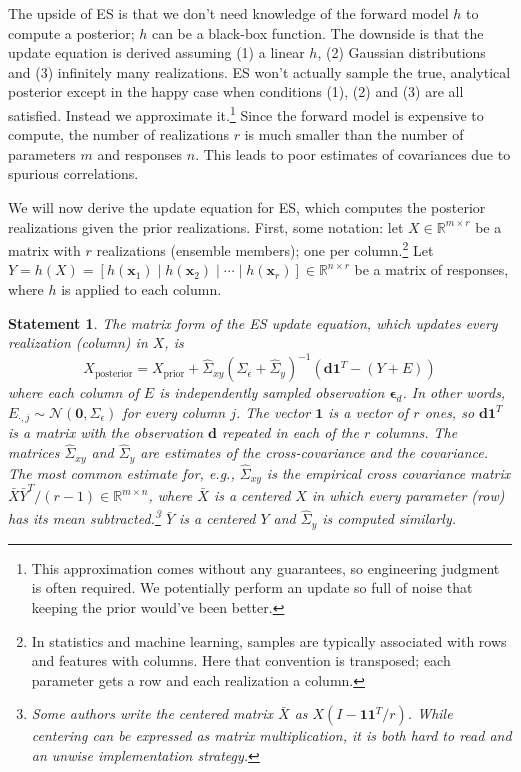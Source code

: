 \documentclass[12pt, a4paper]{article}
\theoremstyle{spaced}
\theoremstyle{spaceddef}
\numberwithin{equation}{section}
\newtheorem{statementinner}[theorem]{Statement}
\newenvironment{statement}
{\savenotes
    \begin{tcolorbox}[colback=white, colframe=black!80, arc=4pt, boxrule=0.5pt]%
        \begin{statementinner}}
        {\end{statementinner}\end{tcolorbox}\spewnotes}
\newcommand{\R}{\mathbb{R}}
\begin{document}
The upside of ES is that we don't need knowledge of the forward model $h$ to compute a posterior; $h$ can be a black-box function.
The downside is that the update equation is derived assuming (1) a linear $h$, (2) Gaussian distributions and (3) infinitely many realizations.
ES won't actually sample the true, analytical posterior except in the happy case when conditions (1), (2) and (3) are all satisfied.
Instead we approximate it.\footnote{This approximation comes without any guarantees, so engineering judgment is often required. We potentially perform an update so full of noise that keeping the prior would've been better.}
Since the forward model is expensive to compute, the number of realizations $r$ is much smaller than the number of parameters $m$ and responses $n$.
This leads to poor estimates of covariances due to spurious correlations.

We will now derive the update equation for ES, which computes the posterior realizations given the prior realizations.
First, some notation: let $X \in \R^{m \times r}$ be a matrix with $r$ realizations (ensemble members); one per column.\footnote{In statistics and machine learning, samples are typically associated with rows and features with columns. Here that convention is transposed; each parameter gets a row and each realization a column.}
Let $Y = h(X) = [ h(\bm{x}_1) \mid h(\bm{x}_2) \mid \cdots \mid h(\bm{x}_r)] \in \R^{n \times r}$ be a matrix of responses, where $h$ is applied to each column.

\begin{statement}
    \label{statement:es}
The matrix form of the ES update equation, which updates every realization (column) in $X$, is
\begin{equation}
    \label{eqn:ensemble_smoother_update}
    X_{\text{posterior}}
    = X_{\text{prior}} +
    \hat{\Sigma}_{xy}
    (
    \Sigma_\epsilon + \hat{\Sigma}_y
    )^{-1} (\bm{d} \bm{1}^T - (Y + E))
\end{equation}
where each column of $E$ is independently sampled observation $\bm{\epsilon}_d$.
In other words, $E_{\cdot, j} \sim \mathcal{N}(\bm{0}, \Sigma_\epsilon)$ for every column $j$.
The vector $\bm{1}$ is a vector of $r$ ones, so $\bm{d} \bm{1}^T$ is a matrix with the observation $\bm{d}$ repeated in each of the $r$ columns.
The matrices $\hat{\Sigma}_{xy}$ and $\hat{\Sigma}_y$ are estimates of the cross-covariance and the covariance.
The most common estimate for, e.g.,  $\hat{\Sigma}_{xy}$ is the empirical cross covariance matrix $\bar{X}\bar{Y}^T / (r-1) \in \R^{m \times n}$,
where $\bar{X}$ is a centered $X$ in which every parameter (row) has its mean subtracted.\footnote{Some authors write the centered matrix $\bar{X}$ as $X (I - \bm{1} \bm{1}^T / r)$.
While centering can be expressed as matrix multiplication, it is both hard to read and an unwise implementation strategy.
}
$\bar{Y}$ is a centered $Y$ and $\hat{\Sigma}_{y}$ is computed similarly.
\end{statement}
\end{document}
